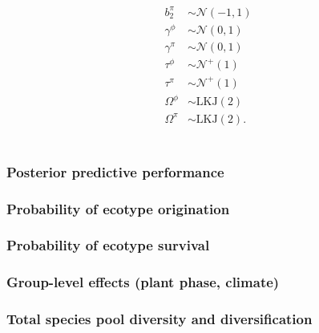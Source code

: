 \documentclass{beamer}
\begin{document}
\begin{frame}
\begin{footnotesize}
\begin{columns}
\begin{column}{0.5\textwidth}
\begin{align*}
          b^{\pi}_{2} &\sim \mathcal{N}(-1, 1) \\
          \gamma^{\phi} &\sim \mathcal{N}(0, 1) \\
          \gamma^{\pi} &\sim \mathcal{N}(0, 1) \\
          \tau^{\phi} &\sim \mathcal{N}^{+}(1) \\
          \tau^{\pi} &\sim \mathcal{N}^{+}(1) \\
          \Omega^{\phi} &\sim \text{LKJ}(2) \\
          \Omega^{\pi} &\sim \text{LKJ}(2). \\
        \end{align*}
      \end{column}
    \end{columns}
  \end{footnotesize} 


\end{frame}



\begin{frame}
  \frametitle{Posterior predictive performance}
\end{frame}

%

\begin{frame}
  \frametitle{Probability of ecotype origination}
\end{frame}

\begin{frame}
  \frametitle{Probability of ecotype survival}
\end{frame}

\begin{frame}
  \frametitle{Group-level effects (plant phase, climate)}
\end{frame}

\begin{frame}
  \frametitle{Total species pool diversity and diversification}
\end{frame}
\end{document}
